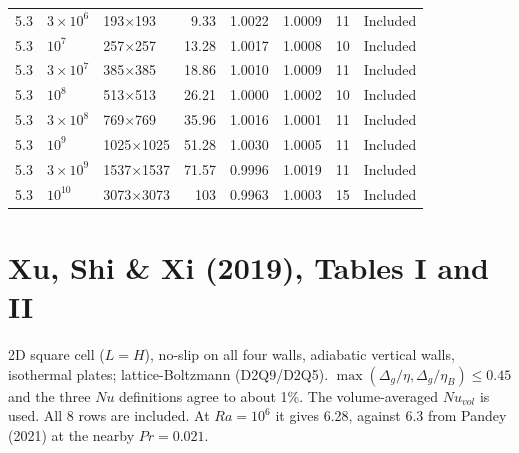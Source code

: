 \documentclass[11pt]{article}
\begin{document}
\begin{longtable}{l l l r r r r p{5.2cm}}
\rowcolor{included} 5.3 & $3\times10^{6}$ & 193$\times$193 & 9.33 & 1.0022 & 1.0009 & 11 & Included \\
\rowcolor{included} 5.3 & $10^{7}$ & 257$\times$257 & 13.28 & 1.0017 & 1.0008 & 10 & Included \\
\rowcolor{included} 5.3 & $3\times10^{7}$ & 385$\times$385 & 18.86 & 1.0010 & 1.0009 & 11 & Included \\
\rowcolor{included} 5.3 & $10^{8}$ & 513$\times$513 & 26.21 & 1.0000 & 1.0002 & 10 & Included \\
\rowcolor{included} 5.3 & $3\times10^{8}$ & 769$\times$769 & 35.96 & 1.0016 & 1.0001 & 11 & Included \\
\rowcolor{included} 5.3 & $10^{9}$ & 1025$\times$1025 & 51.28 & 1.0030 & 1.0005 & 11 & Included \\
\rowcolor{included} 5.3 & $3\times10^{9}$ & 1537$\times$1537 & 71.57 & 0.9996 & 1.0019 & 11 & Included \\
\rowcolor{included} 5.3 & $10^{10}$ & 3073$\times$3073 & 103 & 0.9963 & 1.0003 & 15 & Included \\
\end{longtable}

\section{Xu, Shi \& Xi (2019), Tables I and II}\label{sec:xu2019}
2D square cell ($L=H$), no-slip on all four walls, adiabatic vertical walls,
isothermal plates; lattice-Boltzmann (D2Q9/D2Q5). $\max(\Delta_g/\eta,
\Delta_g/\eta_B)\le0.45$ and the three $Nu$ definitions agree to about 1\%.
The volume-averaged $Nu_{vol}$ is used. All 8 rows are included. At
$Ra=10^6$ it gives 6.28, against 6.3 from Pandey (2021) at the nearby
$Pr=0.021$.
\end{document}
